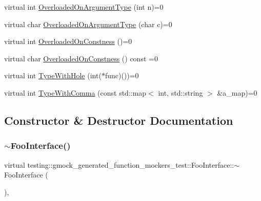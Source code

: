 \begin{DoxyCompactItemize}
\item 
virtual int \mbox{\hyperlink{classtesting_1_1gmock__generated__function__mockers__test_1_1_foo_interface_ad9cc9a11570403fb8378ed6620892ec6}{Overloaded\+On\+Argument\+Type}} (int n)=0
\item 
virtual char \mbox{\hyperlink{classtesting_1_1gmock__generated__function__mockers__test_1_1_foo_interface_a8cb6caa44216ba29fc228b016523abe9}{Overloaded\+On\+Argument\+Type}} (char c)=0
\item 
virtual int \mbox{\hyperlink{classtesting_1_1gmock__generated__function__mockers__test_1_1_foo_interface_afbbe6ec72ae237de05e109dea5b03f4f}{Overloaded\+On\+Constness}} ()=0
\item 
virtual char \mbox{\hyperlink{classtesting_1_1gmock__generated__function__mockers__test_1_1_foo_interface_ab40007385078cdb675616a21ef254df4}{Overloaded\+On\+Constness}} () const =0
\item 
virtual int \mbox{\hyperlink{classtesting_1_1gmock__generated__function__mockers__test_1_1_foo_interface_a9e92ef227dc68806f85ebff9c8a6102a}{Type\+With\+Hole}} (int($\ast$func)())=0
\item 
virtual int \mbox{\hyperlink{classtesting_1_1gmock__generated__function__mockers__test_1_1_foo_interface_a64544adcb9c502a8fbc3990b53f4c767}{Type\+With\+Comma}} (const std\+::map$<$ int, std\+::string $>$ \&a\+\_\+map)=0
\end{DoxyCompactItemize}


\subsection{Constructor \& Destructor Documentation}
\mbox{\label{classtesting_1_1gmock__generated__function__mockers__test_1_1_foo_interface_ad4eb4709c9ae9b1cdaded8d05567cdbb}} 
\subsubsection{\texorpdfstring{$\sim$FooInterface()}{~FooInterface()}\hspace{0.1cm}{\footnotesize\ttfamily [1/3]}}
{\footnotesize\ttfamily virtual testing\+::gmock\+\_\+generated\+\_\+function\+\_\+mockers\+\_\+test\+::\+Foo\+Interface\+::$\sim$\+Foo\+Interface (\begin{DoxyParamCaption}{ }\end{DoxyParamCaption})\hspace{0.3cm}{\ttfamily [inline]}, {\ttfamily [virtual]}}

